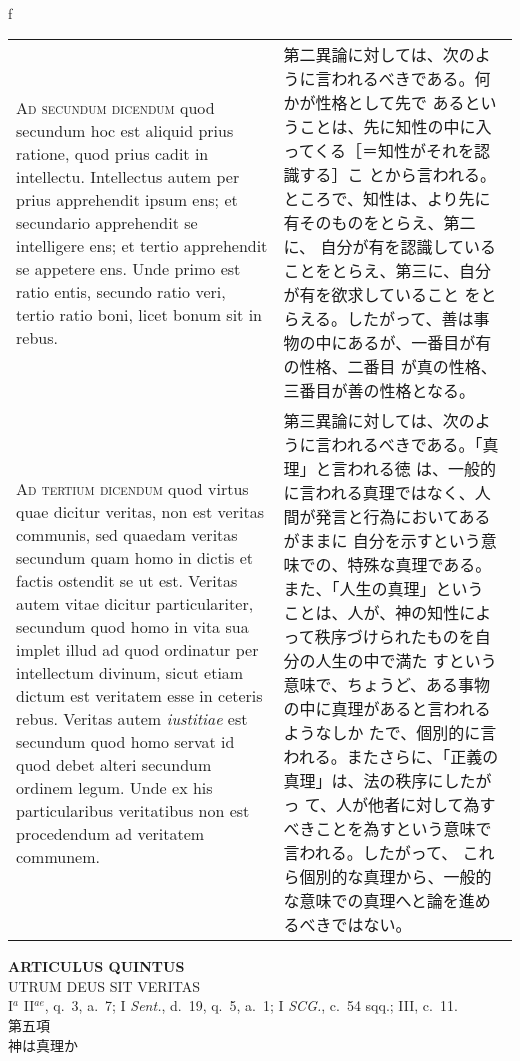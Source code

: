 \\f\documentclass[10pt]{jsarticle} %
\begin{document}
\begin{longtable}{p{21em}p{21em}}
\\

{\scshape Ad secundum dicendum} quod secundum hoc est aliquid prius
ratione, quod prius cadit in intellectu. Intellectus autem per prius
apprehendit ipsum ens; et secundario apprehendit se intelligere ens;
et tertio apprehendit se appetere ens. Unde primo est ratio entis,
secundo ratio veri, tertio ratio boni, licet bonum sit in rebus.

&

第二異論に対しては、次のように言われるべきである。何かが性格として先で
あるということは、先に知性の中に入ってくる［＝知性がそれを認識する］こ
とから言われる。ところで、知性は、より先に有そのものをとらえ、第二に、
自分が有を認識していることをとらえ、第三に、自分が有を欲求していること
をとらえる。したがって、善は事物の中にあるが、一番目が有の性格、二番目
が真の性格、三番目が善の性格となる。

\\


{\scshape Ad tertium dicendum} quod virtus quae dicitur veritas, non
est veritas communis, sed quaedam veritas secundum quam homo in dictis
et factis ostendit se ut est. Veritas autem vitae dicitur
particulariter, secundum quod homo in vita sua implet illud ad quod
ordinatur per intellectum divinum, sicut etiam dictum est veritatem
esse in ceteris rebus. Veritas autem {\itshape iustitiae} est secundum
quod homo servat id quod debet alteri secundum ordinem legum. Unde ex
his particularibus veritatibus non est procedendum ad veritatem
communem.

&

第三異論に対しては、次のように言われるべきである。「真理」と言われる徳
は、一般的に言われる真理ではなく、人間が発言と行為においてあるがままに
自分を示すという意味での、特殊な真理である。また、「人生の真理」という
ことは、人が、神の知性によって秩序づけられたものを自分の人生の中で満た
すという意味で、ちょうど、ある事物の中に真理があると言われるようなしか
たで、個別的に言われる。またさらに、「正義の真理」は、法の秩序にしたがっ
て、人が他者に対して為すべきことを為すという意味で言われる。したがって、
これら個別的な真理から、一般的な意味での真理へと論を進めるべきではない。
\end{longtable}
\newpage


\begin{center}
 {\Large {\bf ARTICULUS QUINTUS}}\\
 {\large UTRUM DEUS SIT VERITAS}\\
 {\footnotesize I$^a$ II$^{ae}$, q.~3, a.~7; I {\itshape Sent.}, d.~19,
 q.~5, a.~1; I {\itshape SCG.}, c.~54 sqq.; III, c.~11.}\\
 {\Large 第五項\\神は真理か}
\end{center}
\end{document}
